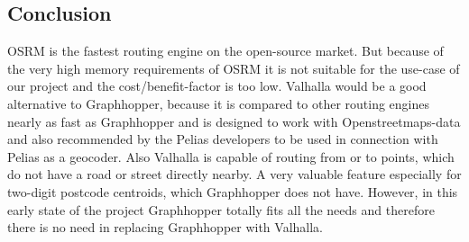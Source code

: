 \subsection{Conclusion}
OSRM is the fastest routing engine on the open-source market. But because of the very high memory requirements of OSRM it is not suitable for the use-case of our project and the cost/benefit-factor is too low. Valhalla would be a good alternative to Graphhopper, because it is compared to other routing engines nearly as fast as Graphhopper and is designed to work with Openstreetmaps-data and also recommended by the Pelias developers to be used in connection with Pelias as a geocoder. Also Valhalla is capable of routing from or to points, which do not have a road or street directly nearby. A very valuable feature especially for two-digit postcode centroids, which Graphhopper does not have. However, in this early state of the project Graphhopper totally fits all the needs and therefore there is no need in replacing Graphhopper with Valhalla.

